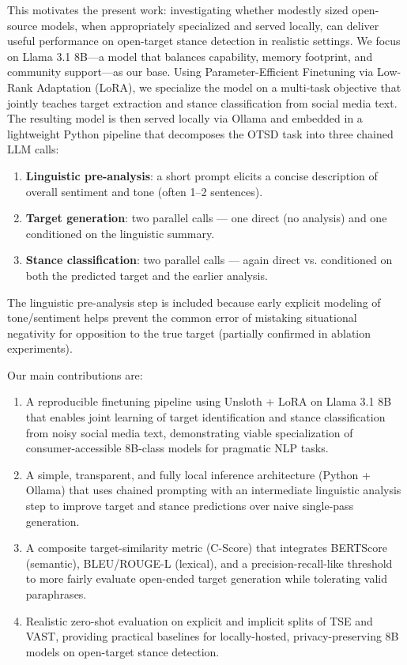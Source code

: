 \documentclass[conference]{IEEEtran}
\begin{document}
This motivates the present work: investigating whether modestly sized open-source models, when appropriately specialized and served locally, can deliver useful performance on open-target stance detection in realistic settings. We focus on Llama 3.1 8B—a model that balances capability, memory footprint, and community support—as our base. Using Parameter-Efficient Finetuning via Low-Rank Adaptation (LoRA), we specialize the model on a multi-task objective that jointly teaches target extraction and stance classification from social media text. The resulting model is then served locally via Ollama and embedded in a lightweight Python pipeline that decomposes the OTSD task into three chained LLM calls:

\begin{enumerate}
    \item \textbf{Linguistic pre-analysis}: a short prompt elicits a concise description of overall sentiment and tone (often 1–2 sentences).
    \item \textbf{Target generation}: two parallel calls — one direct (no analysis) and one conditioned on the linguistic summary.
    \item \textbf{Stance classification}: two parallel calls — again direct vs. conditioned on both the predicted target and the earlier analysis.
\end{enumerate}

The linguistic pre-analysis step is included because early explicit modeling of tone/sentiment helps prevent the common error of mistaking situational negativity for opposition to the true target (partially confirmed in ablation experiments).

Our main contributions are:

\begin{enumerate}
    \item A reproducible finetuning pipeline using Unsloth + LoRA on Llama 3.1 8B that enables joint learning of target identification and stance classification from noisy social media text, demonstrating viable specialization of consumer-accessible 8B-class models for pragmatic NLP tasks.
    \item A simple, transparent, and fully local inference architecture (Python + Ollama) that uses chained prompting with an intermediate linguistic analysis step to improve target and stance predictions over naive single-pass generation.
    \item A composite target-similarity metric (C-Score) that integrates BERTScore (semantic), BLEU/ROUGE-L (lexical), and a precision-recall-like threshold to more fairly evaluate open-ended target generation while tolerating valid paraphrases.
    \item Realistic zero-shot evaluation on explicit and implicit splits of TSE and VAST, providing practical baselines for locally-hosted, privacy-preserving 8B models on open-target stance detection.
\end{enumerate}
\end{document}
